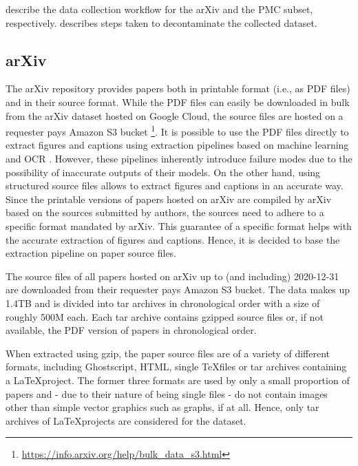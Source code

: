  describe the data collection workflow for the arXiv and the PMC subset, respectively.  describes steps taken to decontaminate the collected dataset.

\subsection{arXiv}
\label{subsec:data.arxiv}

The arXiv repository provides papers both in printable format (i.e., as PDF files) and in their source format. While the PDF files can easily be downloaded in bulk from the arXiv dataset hosted on Google Cloud, the source files are hosted on a requester pays Amazon S3 bucket \footnote{\url{https://info.arxiv.org/help/bulk_data_s3.html}}. It is possible to use the PDF files directly to extract figures and captions using extraction pipelines based on machine learning and OCR \cite{DBLP:conf/jcdl/SiegelLPA18}. However, these pipelines inherently introduce failure modes due to the possibility of inaccurate outputs of their models. On the other hand, using structured source files allows to extract figures and captions in an accurate way. Since the printable versions of papers hosted on arXiv are compiled by arXiv based on the sources submitted by authors, the sources need to adhere to a specific format mandated by arXiv. This guarantee of a specific format helps with the accurate extraction of figures and captions. Hence, it is decided to base the extraction pipeline on paper source files.

The source files of all papers hosted on arXiv up to (and including) 2020-12-31 are downloaded from their requester pays Amazon S3 bucket. The data makes up 1.4TB and is divided into tar archives in chronological order with a size of roughly 500M each. Each tar archive contains gzipped source files or, if not available, the PDF version of papers in chronological order.

When extracted using gzip, the paper source files are of a variety of different formats, including Ghostscript, HTML, single \TeX files or tar archives containing a \LaTeX project. The former three formats are used by only a small proportion of papers and - due to their nature of being single files - do not contain images other than simple vector graphics such as graphs, if at all. Hence, only tar archives of \LaTeX projects are considered for the dataset.

